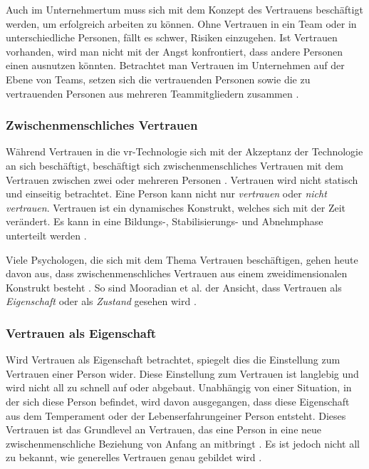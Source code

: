 \documentclass[a4paper,11pt]{article}%
\renewcommand{\\}{\vspace*{0.5\baselineskip} \newline}
\begin{document}
Auch im Unternehmertum muss sich mit dem Konzept des Vertrauens beschäftigt werden, um erfolgreich arbeiten zu können. Ohne Vertrauen in ein Team oder in unterschiedliche Personen, fällt es schwer, Risiken einzugehen. Ist Vertrauen vorhanden, wird man nicht mit der Angst konfrontiert, dass andere Personen einen ausnutzen könnten. Betrachtet man Vertrauen im Unternehmen auf der Ebene von Teams, setzen sich die vertrauenden Personen sowie die zu vertrauenden Personen aus mehreren Teammitgliedern zusammen \citep[S.1152]{breuer2016does}.

 

		\subsubsection{Zwischenmenschliches Vertrauen}
Während Vertrauen in die \ac{vr}-Technologie sich mit der Akzeptanz der Technologie an sich beschäftigt, beschäftigt sich zwischenmenschliches Vertrauen mit dem Vertrauen zwischen zwei oder mehreren Personen \citep{mcknight2011trust}.
Vertrauen wird nicht statisch und einseitig betrachtet. Eine Person kann nicht nur \textit{vertrauen} oder \textit{nicht vertrauen}. Vertrauen ist ein dynamisches Konstrukt, welches sich mit der Zeit verändert. Es kann in eine Bildungs-, Stabilisierungs- und Abnehmphase unterteilt werden \citep[S.396]{rousseau1998not}.

Viele Psychologen, die sich mit dem Thema Vertrauen beschäftigen, gehen heute davon aus, dass zwischenmenschliches Vertrauen aus einem zweidimensionalen Konstrukt besteht \citep{johnson2005cognitive} \citep{cook1980new}. So sind Mooradian et al. der Ansicht, dass Vertrauen als \textit{Eigenschaft} oder als \textit{Zustand} gesehen wird \citep[S.524-525]{mooradian2006trusts}.

	\subsubsection{Vertrauen als Eigenschaft }
\label{Vertrauen als Eigenschaft}
Wird Vertrauen als Eigenschaft betrachtet, spiegelt dies die Einstellung zum Vertrauen einer Person wider. Diese Einstellung zum Vertrauen ist langlebig und wird nicht all zu schnell auf oder abgebaut. Unabhängig von einer Situation, in der sich diese Person befindet, wird davon ausgegangen, dass diese Eigenschaft aus dem Temperament oder der Lebenserfahrungeiner Person entsteht. Dieses Vertrauen ist das Grundlevel an Vertrauen, das eine Person in eine neue zwischenmenschliche Beziehung von Anfang an mitbringt \citep[S.11]{couch1996assessment}. Es ist jedoch nicht all zu bekannt, wie generelles Vertrauen genau gebildet wird \citep[S.409]{stolle2002trusting}.
\end{document}
